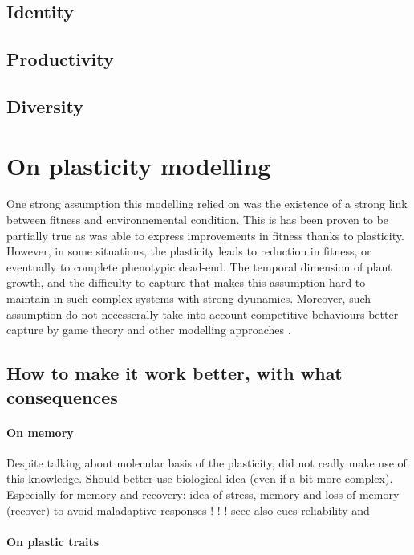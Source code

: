 \subsection{Identity}
\subsection{Productivity}
\subsection{Diversity}

\section{On plasticity modelling}
One strong assumption this modelling relied on was the existence of a strong link between fitness and environnemental condition. This is has been proven to be partially true as \model was able to express improvements in fitness thanks to plasticity. However, in some situations, the plasticity leads to reduction in fitness, or eventually to complete phenotypic dead-end. The temporal dimension of plant growth, and the difficulty to capture that makes this assumption hard to maintain in such complex systems with strong dyunamics. Moreover, such assumption do not necesserally take into account competitive behaviours better capture by game theory and other modelling approaches \cite{farrior_resource_2011, dybzinski_evolutionarily_2011}.


\subsection{How to make it work better, with what consequences} 
\paragraph{On memory}

Despite talking about molecular basis of the plasticity, did not really make use of this knowledge. Should better use biological idea (even if a bit more complex). Especially for memory and recovery: idea of stress, memory and loss of memory (recover) to avoid maladaptive responses \parencite{crisp_reconsidering_2016} ! ! ! 
seee also cues reliability \parencite{simons_playing_2014} and \parencite{scheiner_genetics_1989, scheiner_genetics_2002, scheiner_genetics_2012, scheiner_genetics_2013}

\paragraph{On plastic traits}


